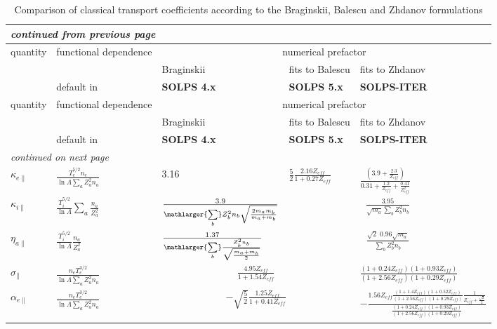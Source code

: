 \documentclass[a4paper,10pt]{report}
\newcommand\SOLPSfour{{\bf SOLPS 4.x} }
\newcommand\SOLPSfive{{\bf SOLPS 5.x} }
\newcommand\SOLPSITER{{\bf SOLPS-ITER} }
\begin{document}
\begin{center}
    \begin{longtable}{|l|l|l|l|l|}
    \hline
    \multicolumn{5}{|l|}{\small\sl continued from previous page} \\
    \hline quantity & functional dependence & \multicolumn{3}{|c|}{numerical prefactor} \\
    \hline          &                       & Braginskii & fits to Balescu & fits to Zhdanov \\
    \hline          & default in            & \SOLPSfour & \SOLPSfive & \SOLPSITER \\
    \hline \endhead
    \hline quantity & functional dependence & \multicolumn{3}{|c|}{numerical prefactor} \\
    \hline          &                       & Braginskii & fits to Balescu & fits to Zhdanov \\
    \hline          & default in            & \SOLPSfour & \SOLPSfive & \SOLPSITER \\
    \hline \endfirsthead
    \hline
    \multicolumn{5}{|l|}{\small\sl continued on next page} \\
    \hline \endfoot
    \endlastfoot
$\kappa _{e \parallel}$ & $\frac{T_e^{5/2} n_e}{\ln \Lambda \sum \limits_a Z_a^2 n_a}$ & 3.16 & $\frac{5}{2} \frac{2.16 Z_{eff}}{1 + 0.27 Z_{eff}}$ & $\frac{\left( 3.9 +\frac{2.3}{Z_{eff}} \right)}{0.31+\frac{1.2}{Z_{eff}}+\frac{0.41}{Z_{eff}^2}}$ \\ \hline
$\kappa _{i \parallel}$ & $\frac{T_i^{5/2}}{\ln \Lambda}\sum \limits_a \frac{n_a}{Z_a^2}$ & $\frac{3.9}{\mathlarger{\sum \limits_b} Z_b^2 n_b \sqrt{\frac{2 m_a m_b}{m_a + m_b}}}$ & \multicolumn{2}{|c|}{$\frac{3.95}{\sqrt{m_a} \sum \limits_b Z_b^2 n_b}$} \\ \hline
$\eta _{a \parallel}$ & $\frac{T_i^{5/2}}{\ln \Lambda}\frac{n_a}{Z_a^2}$ & $\frac{1.37}{\mathlarger{\sum \limits_b} \frac{Z_b^2 n_b}{\sqrt{\frac{m_a + m_b}{2}}}}$ & \multicolumn{2}{|c|}{$\frac{\sqrt{2} \; 0.96 \sqrt{m_a}}{\sum \limits_b Z_b^2 n_b}$} \\ \hline
$\sigma_\parallel$ & $\frac{n_e T_e^{3/2}}{\ln \Lambda \sum \limits_a Z_a^2 n_a}$ & \multicolumn{2}{|c|}{$\frac{4.95 Z_{eff}}{1 + 1.54 Z_{eff}}$} & $\frac{(1+0.24 Z_{eff})(1+0.93 Z_{eff})}{(1+2.56 Z_{eff})(1+0.29 Z_{eff})}$ \\ \hline
$\alpha_{e \parallel}$ & $\frac{n_e T_e^{3/2}}{\ln \Lambda \sum \limits_a Z_a^2 n_a}$ & \multicolumn{2}{|c|}{$-\sqrt{\frac{5}{2}}\frac{1.25 Z_{eff}}{1+0.41 Z_{eff}}$} & $-\frac{1.56 Z_{eff} \frac{\left( 1+1.4 Z_{eff} \right) \left( 1+0.52 Z_{eff} \right)}{\left( 1+2.56 Z_{eff} \right) \left( 1+0.29 Z_{eff} \right)} \frac{1}{Z_{eff} + \frac{\sqrt{2}}{2}}}{\frac{\left( 1+0.24 Z_{eff} \right) \left( 1+0.93 Z_{eff} \right)}{\left( 1+2.56 Z_{eff} \right) \left( 1+0.29 Z_{eff} \right)}}$ \\
    \hline
    \caption{Comparison of classical transport coefficients according to the Braginskii, Balescu and Zhdanov formulations}
    \label{tab:comparetransport}
  \end{longtable}
\end{center}
\end{document}
